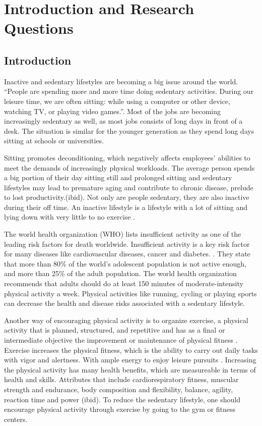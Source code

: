 \chapter{Introduction and Research Questions}
\section{Introduction}
Inactive and sedentary lifestyles are becoming a big issue around the world. “People are spending more and more time doing sedentary activities. During our leisure time, we are often sitting: while using a computer or other device, watching TV, or playing video games.”\cite{NIH}. Most of the jobs are becoming increasingly sedentary as well, as most jobs consists of long days in front of a desk. The situation is similar for the younger generation as they spend long days sitting at schools or universities. 

Sitting promotes deconditioning, which negatively affects employees’ abilities to meet the demands of increasingly physical workloads.\cite{Lurati} The average person spends a big portion of their day sitting still and prolonged sitting and sedentary lifestyles may lead to premature aging and contribute to chronic disease, prelude to lost productivity.(ibid). Not only are people sedentary, they are also inactive during their off time. An inactive lifestyle is a lifestyle with a lot of sitting and lying down with very little to no exercise \cite{NIH2} .

The world health organization (WHO) lists insufficient activity as one of the leading risk factors for death worldwide.  Insufficient activity is a key risk factor for many diseases like cardiovascular diseases, cancer and diabetes. \cite{WHO}. They state that more than 80\% of the world’s adolescent population is not active enough, and more than 25\% of the adult population. The world health organization recommends that adults should do at least 150 minutes of moderate-intensity physical activity a week.  Physical activities like running, cycling or playing sports can decrease the health and disease risks associated with a sedentary lifestyle. 

Another way of encouraging physical activity is to organize exercise, a physical activity that is planned, structured, and repetitive and has as a final or intermediate objective the improvement or maintenance of physical fitness \cite{Garber2011}. Exercise increases the physical fitness, which is the ability to carry out daily tasks with vigor and alertness. With ample energy to enjoy leisure pursuits \cite{Garber2011}. Increasing the physical activity has many health benefits, which are measureable in terms of health and skills. Attributes that include cardiorespiratory fitness, muscular strength and endurance, body composition and flexibility, balance, agility, reaction time and power (ibid). To reduce the sedentary lifestyle, one should encourage physical activity through exercise by going to the gym or fitness centers.

